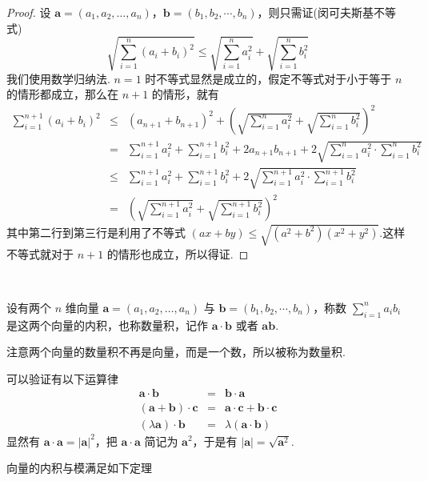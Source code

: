 \begin{proof}
  设 $\bm{a}= (a_1, a_2 , \ldots, a_n)$，$\bm{b}= (b_1,
  b_2, \cdots, b_n)$，则只需证(闵可夫斯基不等式)
  \[ \sqrt{\sum_{i = 1}^n (a_i + b_i)^2} \leqslant \sqrt{\sum_{i = 1}^n a_i^2}
     + \sqrt{\sum_{i = 1}^n b_i^2} \]
  我们使用数学归纳法. $n = 1$
  时不等式显然是成立的，假定不等式对于小于等于 $n$
  的情形都成立，那么在 $n + 1$ 的情形，就有
  \begin{eqnarray*}
    \sum_{i = 1}^{n + 1} (a_i + b_i)^2 & \leqslant & (a_{n + 1} + b_{n + 1})^2
    + \left( \sqrt{\sum_{i = 1}^n a_i^2} + \sqrt{\sum_{i = 1}^n b_i^2}
    \right)^2\\
    & = & \sum_{i = 1}^{n + 1} a_i^2 + \sum_{i = 1}^{n + 1} b_i^2 + 2 a_{n +
    1} b_{n + 1} + 2 \sqrt{\sum_{i = 1}^n a_i^2 \cdot \sum_{i = 1}^n b_i^2}\\
    & \leqslant & \sum_{i = 1}^{n + 1} a_i^2 + \sum_{i = 1}^{n + 1} b_i^2 + 2
    \sqrt{\sum_{i = 1}^{n + 1} a_i^2 \cdot \sum_{i = 1}^{n + 1} b_i^2}\\
    & = & \left( \sqrt{\sum_{i = 1}^{n + 1} a_i^2} + \sqrt{\sum_{i = 1}^{n +
    1} b_i^2} \right)^2
  \end{eqnarray*}
  其中第二行到第三行是利用了不等式 $(a x + b y) \leqslant
  \sqrt{(a^2 + b^2) (x^2 + y^2)}$.这样不等式就对于 $n + 1$
  的情形也成立，所以得证.
\end{proof}

\

\begin{definition}
  设有两个 $n$ 维向量 $\bm{a}= (a_1, a_2 , \ldots, a_n)$
  与 $\bm{b}= (b_1, b_2, \cdots, b_n)$，称数 $\sum_{i = 1}^n a_i
  b_i$ 是这两个向量的内积，也称数量积，记作 $\bm{a}
  \cdot \bm{b}$ 或者 $\bm{a}\bm{b}$. 
\end{definition}

注意两个向量的数量积不再是向量，而是一个数，所以被称为数量积.

可以验证有以下运算律
\begin{eqnarray*}
  \bm{a} \cdot \bm{b} & = & \bm{b} \cdot \bm{a}\\
  (\bm{a}+\bm{b}) \cdot \bm{c} & = & \bm{a} \cdot
  \bm{c}+\bm{b} \cdot \bm{c}\\
  (\lambda \bm{a}) \cdot \bm{b} & = & \lambda (\bm{a} \cdot
  \bm{b})
\end{eqnarray*}
显然有 $\bm{a} \cdot \bm{a}= | \bm{a} |^2$，把
$\bm{a} \cdot \bm{a}$ 简记为 $\bm{a}^2$，于是有 $|
\bm{a} | = \sqrt{\bm{a}^2}$.

向量的内积与模满足如下定理

